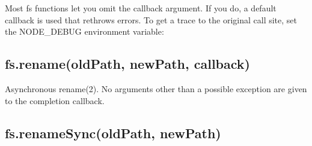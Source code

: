 Most fs functions let you omit the callback argument. If you do, a
default callback is used that rethrows errors. To get a trace to the
original call site, set the NODE\_DEBUG environment variable:

\begin{Shaded}
\begin{Highlighting}[]
 \NormalTok{() \{}
  \NormalTok{(}\NormalTok{(}\NormalTok{);}
\NormalTok{\}}
\NormalTok{();}

\NormalTok{:}
         
              \NormalTok{^}
     \NormalTok{(}\NormalTok{:}\NormalTok{:}\NormalTok{)}
     \NormalTok{(}\NormalTok{:}\NormalTok{:}\NormalTok{)}
     \NormalTok{(}\NormalTok{:}\NormalTok{:}\NormalTok{)}
     \NormalTok{(}\FloatTok{)}
\FloatTok{(}\NormalTok{:}\NormalTok{:}\NormalTok{)}
    \NormalTok{<}
\end{Highlighting}
\end{Shaded}

\subsection{fs.rename(oldPath, newPath,
callback)}\label{fs.renameoldpath-newpath-callback}

Asynchronous rename(2). No arguments other than a possible exception are
given to the completion callback.

\subsection{fs.renameSync(oldPath,
newPath)}\label{fs.renamesyncoldpath-newpath}

